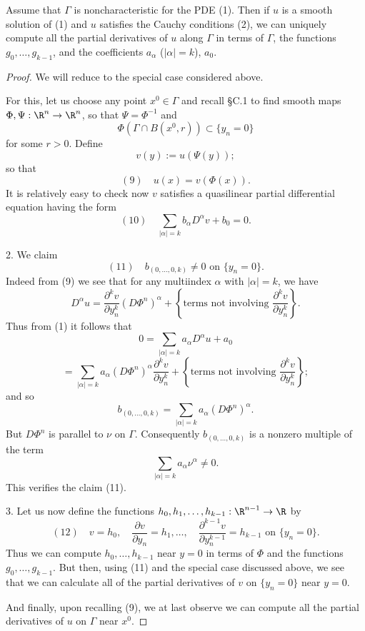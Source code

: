 \begin{theorem}
\label{thm:cauchy-data-noncharacteristic-surfaces}
Assume that $\Gamma$ is noncharacteristic for the PDE (1). Then if $u$ is a smooth solution of (1) and $u$ satisfies the Cauchy conditions (2), we can uniquely compute all the partial derivatives of $u$ along $\Gamma$ in terms of $\Gamma$, the functions $g_0, \ldots, g_{k-1}$, and the coefficients $a_\alpha$ ($|\alpha| = k$), $a_0$.
\end{theorem}
\begin{proof}
We will reduce to the special case considered above.

For this, let us choose any point $x^0 \in \Gamma$ and recall \S C.1 to find smooth maps $\Phi, \Psi : \R^n \to \R^n$, so that $\Psi = \Phi^{-1}$ and
$$\Phi(\Gamma \cap B(x^0, r)) \subset \{y_n = 0\}$$
for some $r > 0$. Define
$$v(y) := u(\Psi(y));$$
so that
$$(9) \quad u(x) = v(\Phi(x)).$$
It is relatively easy to check now $v$ satisfies a quasilinear partial differential equation having the form
$$(10) \quad \sum_{|\alpha|=k} b_\alpha D^\alpha v + b_0 = 0.$$

2. We claim
$$(11) \quad b_{(0,\ldots,0,k)} \neq 0 \text{ on } \{y_n = 0\}.$$
Indeed from (9) we see that for any multiindex $\alpha$ with $|\alpha| = k$, we have
$$D^\alpha u = \frac{\partial^k v}{\partial y_n^k}(D\Phi^n)^\alpha + \left\{\text{terms not involving } \frac{\partial^k v}{\partial y_n^k}\right\}.$$
Thus from (1) it follows that
$$0 = \sum_{|\alpha|=k} a_\alpha D^\alpha u + a_0$$
$$= \sum_{|\alpha|=k} a_\alpha(D\Phi^n)^\alpha \frac{\partial^k v}{\partial y_n^k} + \left\{\text{terms not involving } \frac{\partial^k v}{\partial y_n^k}\right\};$$
and so
$$b_{(0,\ldots,0,k)} = \sum_{|\alpha|=k} a_\alpha(D\Phi^n)^\alpha.$$
But $D\Phi^n$ is parallel to $\nu$ on $\Gamma$. Consequently $b_{(0,\ldots,0,k)}$ is a nonzero multiple of the term
$$\sum_{|\alpha|=k} a_\alpha \nu^\alpha \neq 0.$$
This verifies the claim (11).

3. Let us now define the functions $h_0, h_1, \ldots, h_{k-1} : \R^{n-1} \to \R$ by
$$(12) \quad v = h_0, \quad \frac{\partial v}{\partial y_n} = h_1, \ldots, \quad \frac{\partial^{k-1} v}{\partial y_n^{k-1}} = h_{k-1} \text{ on } \{y_n = 0\}.$$
Thus we can compute $h_0, \ldots, h_{k-1}$ near $y = 0$ in terms of $\Phi$ and the functions $g_0, \ldots, g_{k-1}$. But then, using (11) and the special case discussed above, we see that we can calculate all of the partial derivatives of $v$ on $\{y_n = 0\}$ near $y = 0$.

And finally, upon recalling (9), we at last observe we can compute all the partial derivatives of $u$ on $\Gamma$ near $x^0$.
\end{proof}

